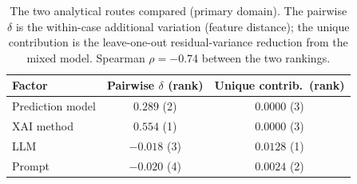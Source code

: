 \begin{table}[t]
  \centering
  \caption{The two analytical routes compared (primary domain). The pairwise
  $\delta$ is the within-case additional variation (feature distance); the unique
  contribution is the leave-one-out residual-variance reduction from the mixed
  model. Spearman $\rho = -0.74$ between the two rankings.}
  \label{tab:mixed-agree}
  \small
  \begin{tabular}{lcc}
    \toprule
    Factor & Pairwise $\delta$ (rank) & Unique contrib.\ (rank) \\
    \midrule
    Prediction model & $0.289$ \;(2) & $0.0000$ \;(3) \\
    XAI method & $0.554$ \;(1) & $0.0000$ \;(3) \\
    LLM & $-0.018$ \;(3) & $0.0128$ \;(1) \\
    Prompt & $-0.020$ \;(4) & $0.0024$ \;(2) \\
    \bottomrule
  \end{tabular}
\end{table}
